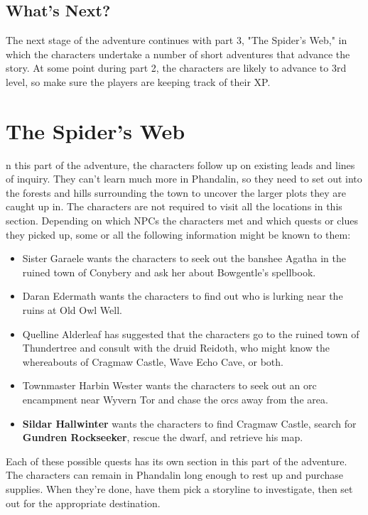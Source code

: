 \documentclass[10pt,a4paper,twoside,bg=print,twocolumn,openany,nodeprecatedcode]{dndbook}
\begin{document}
\section{What's Next?}
The next stage of the adventure continues with part 3, "The Spider's Web," in which the characters undertake a number of short adventures that advance the story. At some point during part 2, the characters are likely to advance to 3rd level, so make sure the players are keeping track of their XP.

\chapter{The Spider's Web}
n this part of the adventure, the characters follow up on existing leads and lines of inquiry. They can't learn much more in Phandalin, so they need to set out into the forests and hills surrounding the town to uncover the larger plots they are caught up in. The characters are not required to visit all the locations in this section. Depending on which NPCs the characters met and which quests or clues they picked up, some or all the following information might be known to them:



\begin{itemize}
\item Sister Garaele wants the characters to seek out the banshee Agatha in the ruined town of Conybery and ask her about Bowgentle's spellbook.
\item Daran Edermath wants the characters to find out who is lurking near the ruins at Old Owl Well.
\item Quelline Alderleaf has suggested that the characters go to the ruined town of Thundertree and consult with the druid Reidoth, who might know the whereabouts of Cragmaw Castle, Wave Echo Cave, or both.
\item Townmaster Harbin Wester wants the characters to seek out an orc encampment near Wyvern Tor and chase the orcs away from the area.
\item \textbf{Sildar Hallwinter} wants the characters to find Cragmaw Castle, search for \textbf{Gundren Rockseeker}, rescue the dwarf, and retrieve his map.
\end{itemize}

Each of these possible quests has its own section in this part of the adventure. The characters can remain in Phandalin long enough to rest up and purchase supplies. When they're done, have them pick a storyline to investigate, then set out for the appropriate destination.
\end{document}
